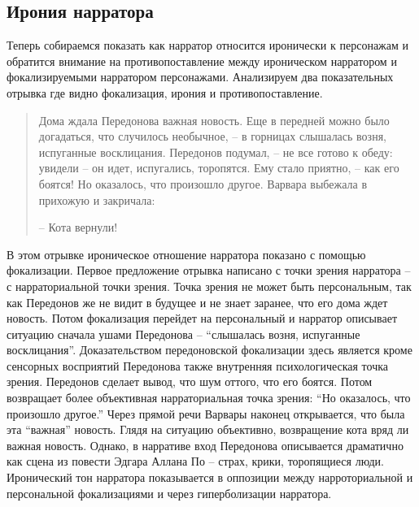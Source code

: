 \documentclass[12pt,a4paper]{article}
\begin{document}



\subsection{Ирония нарратора}



Теперь собираемся показать как нарратор относится иронически к персонажам и обратится внимание на противопоставление между ироническом нарратором и фокализируемыми нарратором персонажами. Анализируем два показательных отрывка где видно фокализация, ирония и противопоставление.

\begin{quote}
Дома ждала Передонова важная новость. Еще в передней можно
было догадаться, что случилось необычное, – в горницах слышалась 
возня, испуганные восклицания. Передонов подумал, – не все
готово к обеду: увидели – он идет, испугались, торопятся. Ему стало
приятно, – как его боятся! Но оказалось, что произошло другое. 
Варвара выбежала в прихожую и закричала:

– Кота вернули!

\parencite[171.]{sologub2004}

\end{quote}

В этом отрывке ироническое отношение нарратора показано с помощью фокализации. Первое предложение отрывка написано с точки зрения нарратора – с нарраториальной точки зрения. Точка зрения не может быть персональным, так как Передонов же не видит в будущее и не знает заранее, что его дома ждет новость. Потом фокализация перейдет на персональный и нарратор описывает ситуацию сначала ушами Передонова – \enquote{слышалась 
возня, испуганные восклицания}. Доказательством передоновской фокализации здесь является кроме сенсорных восприятий Передонова также внутренняя психологическая точка зрения. Передонов сделает вывод, что шум оттого, что его боятся. Потом возвращает более объективная нарраториальная точка зрения: \enquote{Но оказалось, что произошло другое.} Через прямой речи Варвары наконец открывается, что была эта \enquote{важная} новость.
Глядя на ситуацию объективно, возвращение кота вряд ли важная новость. Однако, в нарративе вход Передонова описывается драматично как сцена из повести Эдгара Аллана По – страх, крики, торопящиеся люди. Иронический тон нарратора показывается  в оппозиции между нарроториальной и персональной фокализациями и через гиперболизации нарратора.
\end{document}
